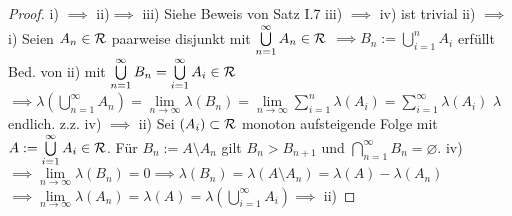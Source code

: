  \begin{proof}
    i) $\implies$ ii)$ \implies$ iii) Siehe Beweis von Satz I.7 \newline
    iii) $\implies$ iv) ist trivial \newline
    ii) $\implies$ i) Seien $A_n\in\mathcal{R}$ paarweise disjunkt mit $\bigcup\limits_{n=1}^{\infty}A_n\in\mathcal{R}$ \newline
    $\implies B_n := \bigcup\limits_{i=1}^{n}A_i$ erfüllt Bed. von ii) mit $\bigcup\limits_{n=1}^{\infty}B_n = \bigcup\limits_{i=1}^{\infty}A_i\in\mathcal{R}$ \newline
    $\implies \lambda(\bigcup\limits_{n=1}^{\infty}A_n) = \lim\limits_{n\to\infty} \lambda(B_n) = \lim\limits_{n\to\infty} \sum\limits_{i=1}^{n}\lambda(A_i) = \sum\limits_{i=1}^{\infty}\lambda(A_i)$ \newline
    $\lambda$ endlich. z.z. iv) $\implies$ ii) \newline
    Sei $(A_i)\subset\mathcal{R}$ monoton aufsteigende Folge mit $A := \bigcup\limits_{i=1}^{\infty}A_i\in\mathcal{R}$. Für $B_n := A\setminus A_n$ gilt $B_n > B_{n+1}$ und $\bigcap\limits_{n=1}^{\infty}B_n = \varnothing$. \newline
    iv) $\implies \lim\limits_{n\to\infty}\lambda(B_n) = 0 \implies \lambda(B_n) = \lambda(A\setminus A_n) = \lambda(A) - \lambda(A_n)$ \newline
    $\implies \lim\limits_{n\to\infty}\lambda(A_n) = \lambda(A) = \lambda(\bigcup\limits_{i=1}^{\infty}A_i)\implies$ ii)
  \end{proof}

